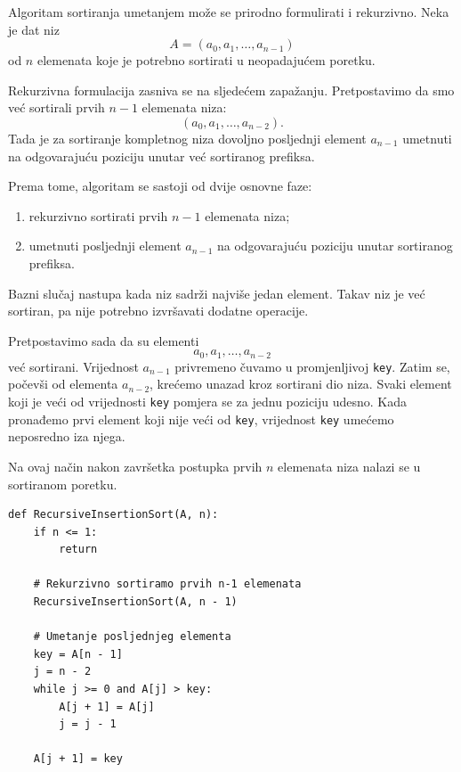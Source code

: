 \begin{solution}
    Algoritam sortiranja umetanjem može se prirodno formulirati i rekurzivno.
     Neka je dat niz
 \[
 A = (a_0,a_1,\ldots,a_{n-1})
 \]
 od $n$ elemenata koje je potrebno sortirati u neopadajućem poretku.
 
 Rekurzivna formulacija zasniva se na sljedećem zapažanju. Pretpostavimo da smo
 već sortirali prvih $n-1$ elemenata niza:
 \[
 (a_0,a_1,\ldots,a_{n-2}).
 \]
 Tada je za sortiranje kompletnog niza dovoljno posljednji element
 $a_{n-1}$ umetnuti na odgovarajuću poziciju unutar već sortiranog prefiksa.
 
 Prema tome, algoritam se sastoji od dvije osnovne faze:
 
 \begin{enumerate}
 	\item rekurzivno sortirati prvih $n-1$ elemenata niza;
 	\item umetnuti posljednji element $a_{n-1}$ na odgovarajuću poziciju
 	unutar sortiranog prefiksa.
 \end{enumerate}
 
 Bazni slučaj nastupa kada niz sadrži najviše jedan element. Takav niz je već
 sortiran, pa nije potrebno izvršavati dodatne operacije.
 
 Pretpostavimo sada da su elementi
 \[
 a_0,a_1,\ldots,a_{n-2}
 \]
 već sortirani. Vrijednost $a_{n-1}$ privremeno čuvamo u promjenljivoj
 \texttt{key}. Zatim se, počevši od elementa $a_{n-2}$, krećemo unazad kroz
 sortirani dio niza. Svaki element koji je veći od vrijednosti \texttt{key}
 pomjera se za jednu poziciju udesno. Kada pronađemo prvi element koji nije
 veći od \texttt{key}, vrijednost \texttt{key} umećemo neposredno iza njega.
 
 Na ovaj način nakon završetka postupka prvih $n$ elemenata niza nalazi se u sortiranom poretku.
\end{solution}
 
\begin{verbatim}
def RecursiveInsertionSort(A, n):
    if n <= 1:
        return

    # Rekurzivno sortiramo prvih n-1 elemenata
    RecursiveInsertionSort(A, n - 1)

    # Umetanje posljednjeg elementa
    key = A[n - 1]
    j = n - 2
    while j >= 0 and A[j] > key:
        A[j + 1] = A[j]
        j = j - 1

    A[j + 1] = key
\end{verbatim}


